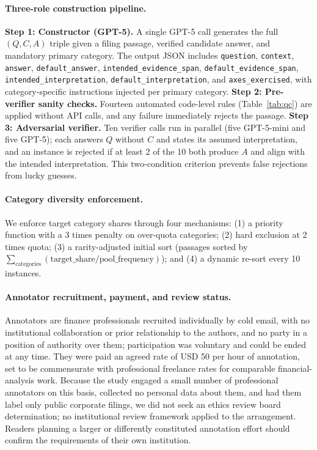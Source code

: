 \paragraph{Three-role construction pipeline.}
\textbf{Step 1: Constructor (GPT-5).} A single GPT-5 call generates the full $(Q, C, A)$ triple
given a filing passage, verified candidate answer, and mandatory primary category. The output JSON
includes \texttt{question}, \texttt{context}, \texttt{answer}, \texttt{default\_answer},
\texttt{intended\_evidence\_span}, \texttt{default\_evidence\_span}, \texttt{intended\_interpretation},
\texttt{default\_interpretation}, and \texttt{axes\_exercised}, with category-specific instructions
injected per primary category. \textbf{Step 2: Pre-verifier sanity checks.} Fourteen automated
code-level rules (Table~\ref{tab:qc}) are applied without API calls, and any failure immediately
rejects the passage. \textbf{Step 3: Adversarial verifier.} Ten verifier calls run in parallel
(five GPT-5-mini and five GPT-5); each answers $Q$ without $C$ and states its assumed
interpretation, and an instance is rejected if at least 2 of the 10 both produce $A$ and align with
the intended interpretation. This two-condition criterion prevents false rejections from lucky
guesses.

\paragraph{Category diversity enforcement.}
We enforce target category shares through four mechanisms: (1) a priority function with a 3 times
penalty on over-quota categories; (2) hard exclusion at 2 times quota; (3) a rarity-adjusted
initial sort (passages sorted by
$\sum_\text{categories}(\text{target\_share}/\text{pool\_frequency})$); and (4) a dynamic re-sort
every 10 instances.

\paragraph{Annotator recruitment, payment, and review status.}
Annotators are finance professionals recruited individually by cold email, with no
institutional collaboration or prior relationship to the authors, and no party in a position
of authority over them; participation was voluntary and could be ended at any time. They were
paid an agreed rate of USD 50 per hour of annotation, set to be commensurate with professional
freelance rates for comparable financial-analysis work. Because the study engaged a small
number of professional annotators on this basis, collected no personal data about them, and
had them label only public corporate filings, we did not seek an ethics review board
determination; no institutional review framework applied to the arrangement. Readers planning
a larger or differently constituted annotation effort should confirm the requirements of their
own institution.

